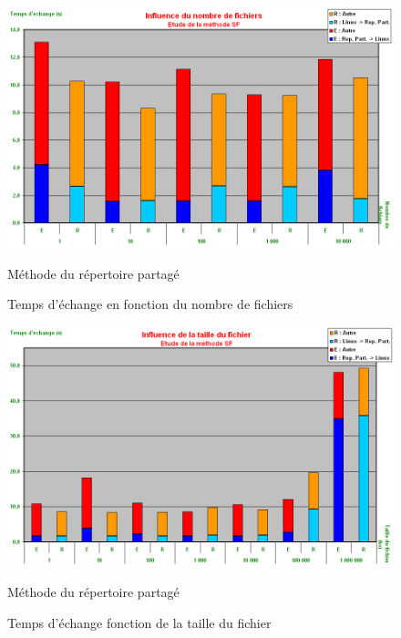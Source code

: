 \begin{figure}[!h]
	\center
	\includegraphics[scale=0.4]{images/tests/nombre_SF.png}
	\caption{Temps d'échange en fonction du nombre de fichiers}
	Méthode du répertoire partagé
\end{figure}

\begin{figure}[!h]
	\center
	\includegraphics[scale=0.4]{images/tests/taille_SF.png}
	\caption{Temps d'échange fonction de la taille du fichier}
	Méthode du répertoire partagé
\end{figure}